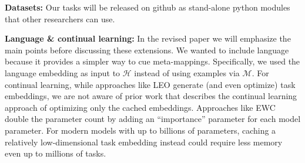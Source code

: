\documentclass{article}
\begin{document}
\textbf{Datasets:} Our tasks will be released on github as stand-alone python modules that other researchers can use. \par
{}
\textbf{Language \& continual learning:} In the revised paper we will emphasize the main points before discussing these extensions. We wanted to include language because it provides a simpler way to cue meta-mappings. Specifically, we used the language embedding as input to $\mathcal{H}$ instead of using examples via $\mathcal{M}$. For continual learning, while approaches like LEO generate (and even optimize) task embeddings, we are not aware of prior work that describes the continual learning approach of optimizing only the cached embeddings. Approaches like EWC double the parameter count by adding an ``importance'' parameter for each model parameter. For modern models with up to billions of parameters, caching a relatively low-dimensional task embedding instead could require less memory even up to millions of tasks. 
\end{document}
